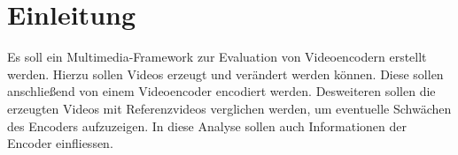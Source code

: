 \section{Einleitung}


Es soll ein Multimedia-Framework zur Evaluation von Videoencodern erstellt werden. Hierzu sollen Videos erzeugt und verändert werden können. Diese sollen anschließend von einem Videoencoder encodiert werden. Desweiteren sollen die erzeugten Videos mit Referenzvideos verglichen werden, um eventuelle Schwächen des Encoders aufzuzeigen. In diese Analyse sollen auch Informationen der Encoder einfliessen.
